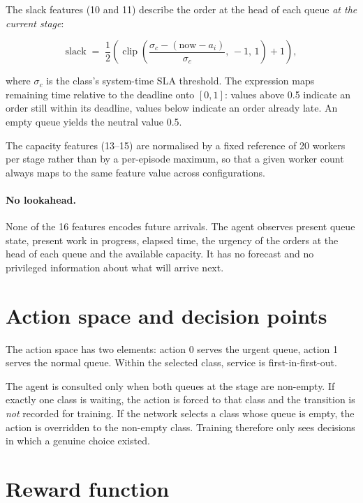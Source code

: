 The slack features (10 and 11) describe the order at the head of each queue \emph{at the current
stage}:

\begin{equation}
\text{slack} \;=\; \frac{1}{2}\left(
\operatorname{clip}\!\left(\frac{\sigma_{c} - (\text{now} - a_i)}{\sigma_c},\, -1,\, 1\right) + 1
\right),
\label{eq:slack}
\end{equation}

\noindent where \(\sigma_c\) is the class's system-time SLA threshold. The expression maps
remaining time relative to the deadline onto \([0,1]\): values above
\num{0.5} indicate an order still within its deadline, values below indicate an order already
late. An empty queue yields the neutral value \num{0.5}.

The capacity features (13--15) are normalised by a fixed reference of 20 workers per stage
rather than by a per-episode maximum, so that a given worker count always maps to the same
feature value across configurations.

\paragraph{No lookahead.} None of the 16 features encodes future arrivals. The agent observes
present queue state, present work in progress, elapsed time, the urgency of the orders at the
head of each queue and the available capacity. It has no forecast and no privileged information
about what will arrive next.

\section{Action space and decision points}

The action space has two elements: action \num{0} serves the urgent queue, action \num{1} serves
the normal queue. Within the selected class, service is first-in-first-out.

The agent is consulted only when both queues at the stage are non-empty. If exactly one class is
waiting, the action is forced to that class and the transition is \emph{not} recorded for
training. If the network selects a class whose queue is empty, the action is overridden to the
non-empty class. Training therefore only sees decisions in which a genuine choice existed.

\section{Reward function}

